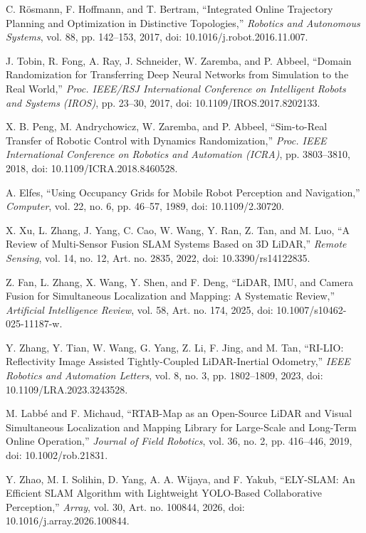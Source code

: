 \documentclass[11pt,a4paper,fontset=none]{ctexart}
\begin{document}
\begin{enumerate}[label={[\arabic*]}]
  \item C. R\"osmann, F. Hoffmann, and T. Bertram, ``Integrated Online Trajectory Planning and Optimization in Distinctive Topologies,'' \emph{Robotics and Autonomous Systems}, vol. 88, pp. 142--153, 2017, doi: 10.1016/j.robot.2016.11.007.
  \item J. Tobin, R. Fong, A. Ray, J. Schneider, W. Zaremba, and P. Abbeel, ``Domain Randomization for Transferring Deep Neural Networks from Simulation to the Real World,'' \emph{Proc. IEEE/RSJ International Conference on Intelligent Robots and Systems (IROS)}, pp. 23--30, 2017, doi: 10.1109/IROS.2017.8202133.
  \item X. B. Peng, M. Andrychowicz, W. Zaremba, and P. Abbeel, ``Sim-to-Real Transfer of Robotic Control with Dynamics Randomization,'' \emph{Proc. IEEE International Conference on Robotics and Automation (ICRA)}, pp. 3803--3810, 2018, doi: 10.1109/ICRA.2018.8460528.
  \item A. Elfes, ``Using Occupancy Grids for Mobile Robot Perception and Navigation,'' \emph{Computer}, vol. 22, no. 6, pp. 46--57, 1989, doi: 10.1109/2.30720.
  \item X. Xu, L. Zhang, J. Yang, C. Cao, W. Wang, Y. Ran, Z. Tan, and M. Luo, ``A Review of Multi-Sensor Fusion SLAM Systems Based on 3D LiDAR,'' \emph{Remote Sensing}, vol. 14, no. 12, Art. no. 2835, 2022, doi: 10.3390/rs14122835.
  \item Z. Fan, L. Zhang, X. Wang, Y. Shen, and F. Deng, ``LiDAR, IMU, and Camera Fusion for Simultaneous Localization and Mapping: A Systematic Review,'' \emph{Artificial Intelligence Review}, vol. 58, Art. no. 174, 2025, doi: 10.1007/s10462-025-11187-w.
  \item Y. Zhang, Y. Tian, W. Wang, G. Yang, Z. Li, F. Jing, and M. Tan, ``RI-LIO: Reflectivity Image Assisted Tightly-Coupled LiDAR-Inertial Odometry,'' \emph{IEEE Robotics and Automation Letters}, vol. 8, no. 3, pp. 1802--1809, 2023, doi: 10.1109/LRA.2023.3243528.
  \item M. Labb\'e and F. Michaud, ``RTAB-Map as an Open-Source LiDAR and Visual Simultaneous Localization and Mapping Library for Large-Scale and Long-Term Online Operation,'' \emph{Journal of Field Robotics}, vol. 36, no. 2, pp. 416--446, 2019, doi: 10.1002/rob.21831.
  \item Y. Zhao, M. I. Solihin, D. Yang, A. A. Wijaya, and F. Yakub, ``ELY-SLAM: An Efficient SLAM Algorithm with Lightweight YOLO-Based Collaborative Perception,'' \emph{Array}, vol. 30, Art. no. 100844, 2026, doi: 10.1016/j.array.2026.100844.

\end{enumerate}
\end{document}
